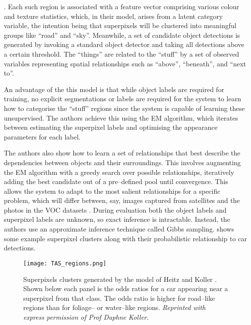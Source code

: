 . Each such region is associated with a feature
vector comprising various colour and texture statistics, which, in
their model, arises from a latent category variable, the intention
being that superpixels will be clustered into meaningful groups like
``road'' and ``sky''. Meanwhile, a set of candidate object detections
is generated by invoking a standard object detector and taking all
detections above a certain threshold. The ``things'' are related to
the ``stuff'' by a set of observed variables representing spatial
relationships such as ``above'', ``beneath'', and ``next to''.

An advantage of the this model is that while object labels are
required for training, no explicit segmentations or labels are
required for the system to learn how to categorise the ``stuff''
regions since the system is capable of learning these
unsupervised. The authors achieve this using the EM algorithm, which
iterates between estimating the superpixel labels and optimising the
appearance parameters for each label.

The authors also show how to learn a set of relationships that best
describe the dependencies between objects and their surroundings. This
involves augmenting the EM algorithm with a greedy search over
possible relationships, iteratively adding the best candidate out of a
pre--defined pool until convergence. This allows the system to adapt
to the most salient relationships for a specific problem, which will
differ between, say, images captured from satellites and the photos in
the VOC datasets \cite{VOC2009}. During evaluation both the object
labels and superpixel labels are unknown, so exact inference is
intractable. Instead, the authors use an approximate inference
technique called Gibbs sampling.   shows some
example superpixel clusters along with their probabilistic
relationship to car detections.

\begin{figure}[tb]
  \centering
  \texttt{[image: TAS\_regions.png]}
  \caption{Superpixels clusters generated by the model of Heitz and
    Koller \cite{Heitz08}. Shown below each panel is the odds ratios for
    a car appearing near a superpixel from that class. The odds ratio is
    higher for road--like regions than for foliage-- or water--like
    regions.
    \textit{Reprinted with express permission of Prof Daphne Koller.}
    }
  \label{fig:TAS-regions}
\end{figure}

